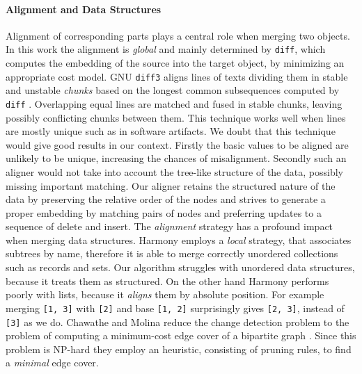 \documentclass{sigplanconf}
\theoremstyle{plain}
\begin{document}
\paragraph{Alignment and Data Structures} 
Alignment of corresponding parts plays a central role when merging
two objects. 
%
In this work the alignment is \emph{global} and mainly determined by
\texttt{diff},
which computes the embedding of the source into the target object, by
minimizing an appropriate cost model.
%
GNU \texttt{diff3} aligns lines of texts dividing them in stable and
unstable \emph{chunks} based on the longest common subsequences
computed by \texttt{diff} \cite{PierceDiff3}.  
%
Overlapping equal lines are matched and fused in stable chunks,
leaving possibly conflicting chunks between them.
%
This technique works well when lines are mostly unique such as in
software artifacts.
%
We doubt that this technique would give good results in our context.
%
Firstly the basic values to be aligned are unlikely to be unique,
increasing the chances of misalignment.
%
Secondly such an aligner would not take into account the tree-like
structure of the data, possibly missing important matching.
%
Our aligner retains the structured nature of the data by preserving
the relative order of the nodes and strives to generate a proper
embedding by matching pairs of nodes and preferring updates
to a sequence of delete and insert.
%
The \emph{alignment} strategy has a profound impact when merging data
structures.
%
Harmony employs a \emph{local} strategy, that associates subtrees by
name, therefore it is able to merge correctly unordered collections
such as records and sets.
%
Our algorithm struggles with unordered data structures, 
because it treats them as structured.
%
On the other hand Harmony performs poorly with lists, because
it \emph{aligns} them by absolute position.
%
For example merging \texttt{[1, 3]} with \texttt{[2]} and base 
\texttt{[1, 2]} surprisingly gives \texttt{[2, 3]}, instead of
\texttt{[3]} as we do.
%
Chawathe and Molina reduce the change detection problem to the problem
of computing a minimum-cost edge cover of a bipartite graph
\cite{Chawathe96}.
%
Since this problem is NP-hard they employ an heuristic, consisting of
pruning rules, to find a \emph{minimal} edge cover.
			
\end{document}
